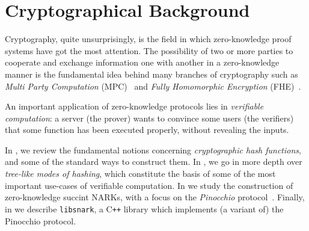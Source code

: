 \chapter{Cryptographical Background}\label{chap:crypto}
Cryptography, quite unsurprisingly, is the field in which zero-knowledge proof systems have 
got the most attention.
The possibility of two or more parties to cooperate and exchange information one with another in a 
zero-knowledge manner is the fundamental idea behind many branches of cryptography such as 
\emph{Multi Party Computation} (MPC)~\cite{Yao1982-2} and \emph{Fully Homomorphic Encryption} 
(FHE)~\cite{ArmknechtEtAl2015}.

An important application of zero-knowledge protocols lies in \emph{verifiable computation}:
a server (the prover) wants to convince some users (the verifiers) that some function has been 
executed properly, without revealing the inputs.

In , we review the fundamental notions concerning 
\emph{cryptographic hash functions}, and some of the standard ways to construct them.
In , we go in more depth over \emph{tree-like modes of hashing}, which 
constitute the basis of some of the most important use-cases of verifiable computation.
In  we study the construction of zero-knowledge succint NARKs, with a focus on 
the \emph{Pinocchio} protocol~\cite{ParnoGHR2013}.
Finally, in  we describe \texttt{libsnark}, a C\texttt{++} library which 
implements (a variant of) the Pinocchio protocol. 





